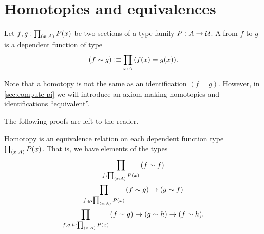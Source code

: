 \documentclass[hott-all.tex]{subfiles}
\begin{document}

\section{Homotopies and equivalences}
\label{sec:basics-equivalences}
%
%
%

\begin{defn} \label{defn:homotopy}
  Let $f,g:\prd{x:A} P(x)$ be two sections of a type family $P:A\to\mathcal{U}$.
  A 
  from $f$ to $g$ is a dependent function of type
  \begin{equation*}
    (f\htpy g) \defeq \prd{x:A} (f(x)=g(x)).
  \end{equation*}
\end{defn}

Note that a homotopy is not the same as an identification $(f=g)$.
However, in \cref{sec:compute-pi} we will introduce an axiom making homotopies and identifications ``equivalent''.

The following proofs are left to the reader.

\begin{lem}\label{lem:homotopy-props}
  Homotopy is an equivalence relation on each dependent function type $\prd{x:A} P(x)$.
  That is, we have elements of the types
  \begin{gather*}
    \prd{f:\prd{x:A} P(x)} (f\htpy f)\\
    \prd{f,g:\prd{x:A} P(x)} (f\htpy g) \to (g\htpy f)\\
    \prd{f,g,h:\prd{x:A} P(x)} (f\htpy g) \to (g\htpy h) \to (f\htpy h).
  \end{gather*}
\end{lem}
\end{document}
